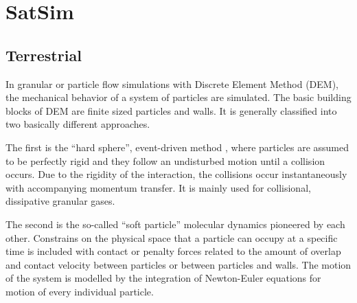 \chapter{SatSim}
\label{chp:satsim}


\section{Terrestrial}

In granular or particle flow simulations with Discrete Element Method (DEM),
the mechanical behavior of a system of particles are simulated. The basic
building blocks of DEM are finite sized particles and walls. It is generally
classified into two basically different approaches.

The first is the ``hard sphere'', event-driven method
, where particles are assumed to be
perfectly rigid and they follow an undisturbed motion until a collision
occurs. Due to the rigidity of the interaction, the collisions occur
instantaneously with accompanying momentum transfer. It is mainly used for
collisional, dissipative granular gases.

The second is the so-called ``soft particle'' molecular dynamics pioneered by
each other. Constrains on the physical space that a particle can occupy at a
specific time is included with contact or penalty forces related to the
amount of overlap and contact velocity between particles or between particles
and walls. The motion of the system is modelled by the integration of
Newton-Euler equations for motion of every individual particle.
